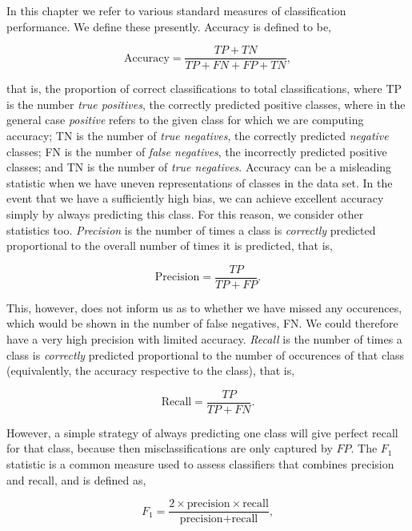 In this chapter we refer to various standard measures of classification performance. We define these presently. Accuracy is defined to be,

\begin{equation}
\text{Accuracy} = \frac{TP + TN}{TP + FN + FP + TN},
\label{eq:accuracy}
\end{equation}

that is, the proportion of correct classifications to total classifications, where TP is the number \emph{true positives}, the correctly predicted positive classes, where in the general case \emph{positive} refers to the given class for which we are computing accuracy; TN is the number of \emph{true negatives}, the correctly predicted \emph{negative} classes; FN is the number of \emph{false negatives}, the incorrectly predicted positive classes; and TN is the number of \emph{true negatives}. Accuracy can be a misleading statistic when we have uneven representations of classes in the data set. In the event that we have a sufficiently high bias, we can achieve excellent accuracy simply by always predicting this class. For this reason, we consider other statistics too. \emph{Precision} is the number of times a class is \emph{correctly} predicted proportional to the overall number of times it is predicted, that is,

\begin{equation}
\text{Precision} = \frac{TP}{TP + FP}.
\label{eq:precision}
\end{equation}

This, however, does not inform us as to whether we have missed any occurences, which would be shown in the number of false negatives, FN. We could therefore have a very high precision with limited accuracy. \emph{Recall} is the number of times a class is \emph{correctly} predicted proportional to the number of occurences of that class (equivalently, the accuracy respective to the class), that is,

\begin{equation}
\text{Recall} = \frac{TP}{TP + FN}.
\label{eq:recall}
\end{equation}

However, a simple strategy of always predicting one class will give perfect recall for that class, because then misclassifications are only captured by $FP$. The $F_1$ statistic is a common measure used to assess classifiers that combines precision and recall, and is defined as,

\begin{equation}
F_1 = \frac{2 \times \text{precision} \times \text{recall}}{\text{precision} + \text{recall}},
\label{eq:f1}
\end{equation}

